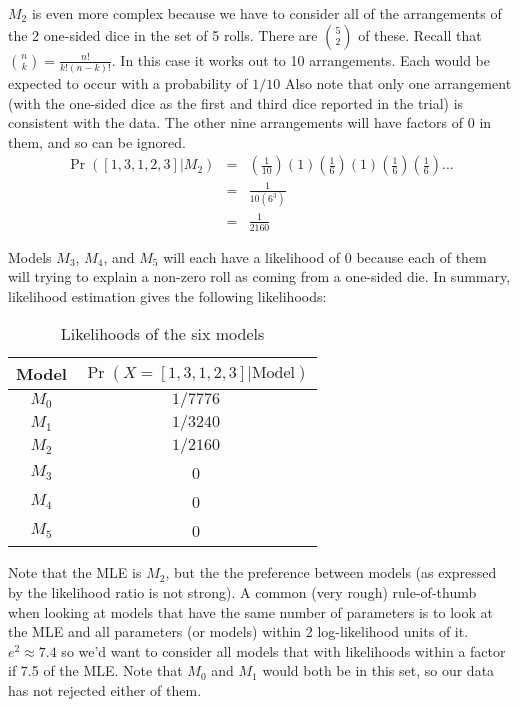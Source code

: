 \documentclass[11pt]{article}
\begin{document}
$M_2$ is even more complex because we have to consider all of the arrangements of the 2 one-sided dice in the set of 5 rolls.
There are $5\choose2$ of these. Recall that ${n\choose k} = \frac{n!}{k!(n-k)!}$. In this case it works out to 10 arrangements.
Each would be expected to occur with a probability of $1/10$
Also note that only one arrangement (with the one-sided dice as the first and third dice reported in the trial) is consistent with the data. The other nine arrangements will have factors of 0 in them, and so can be ignored.
\begin{eqnarray}
	\Pr([1, 3, 1, 2, 3]|M_2) & = & \left(\frac{1}{10}\right)\left(1\right)\left(\frac{1}{6}\right)\left(1\right)\left(\frac{1}{6}\right)\left(\frac{1}{6}\right) \ldots \\
		& = & \frac{1}{10 (6^3)}\\
		& = & \frac{1}{2160}
\end{eqnarray}

Models $M_3$, $M_4$, and $M_5$ will each have a likelihood of 0 because each of them will trying to explain a non-zero roll as coming from a one-sided die.
In summary, likelihood estimation gives the following likelihoods:\\
\begin{table}[htdp]
\caption{Likelihoods of the six models}\label{modpred}
\begin{center}
\begin{tabular}{|c|c|}
\hline
Model & $\Pr(X=[1, 3, 1, 2, 3] | \mbox{Model})$\\
\hline 
$M_0$ & ${1/7776}$\\
$M_1$ & ${1/3240}$ \\
$M_2$ & ${1/2160}$ \\
$M_3$ & 0 \\
$M_4$ & 0 \\
$M_5$ & 0 \\
\hline 
\end{tabular}
\end{center}
\end{table}

Note that the MLE is $M_2$, but the the preference between models (as expressed by the likelihood ratio is not strong).  A common (very rough) rule-of-thumb when looking at models that have the same number of parameters is to look at the MLE and all parameters (or models) within 2 log-likelihood units of it.
$e^2 \approx 7.4$ so we'd want to consider all models that with likelihoods within a factor if 7.5 of the MLE.
Note that $M_0$ and $M_1$ would both be in this set, so our data has not rejected either of them.
\end{document}
